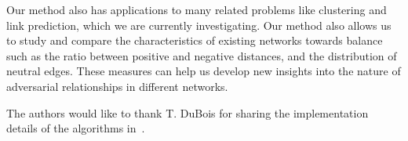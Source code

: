 \documentclass[acmtweb]{acmsmall}
\begin{document}
Our method also has applications to many related problems like
clustering and link prediction, which we are currently
investigating. Our method also allows us to study and compare the
characteristics of existing networks towards balance such as the ratio
between positive and negative distances, and the distribution of
neutral edges. These measures can help us develop new insights into
the nature of adversarial relationships in different networks.

\begin{acks}
The authors would like to thank T. DuBois for sharing the implementation
details of the algorithms in~\cite{golbeck:distrust2011}.
\end{acks}




\end{document}
